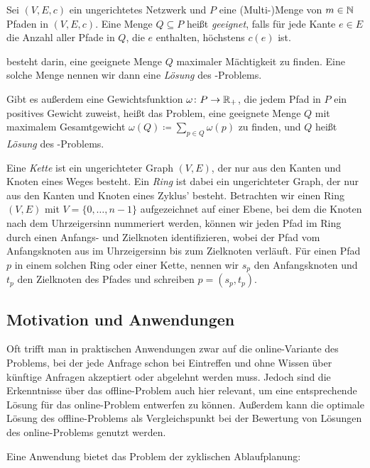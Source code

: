 \begin{definition}
    Sei $(V,E,c)$ ein ungerichtetes Netzwerk und $P$ eine (Multi-)Menge von $m \in \mathbb N$ Pfaden in $(V,E,c)$.
    Eine Menge $Q \subseteq P$ heißt {\em geeignet}, falls für jede Kante $e \in E$ die Anzahl aller Pfade in $Q$,
    die $e$ enthalten, höchstens $c(e)$ ist.
    
    {\em \CallControl} besteht darin, eine geeignete Menge $Q$ maximaler Mächtigkeit zu finden.
    Eine solche Menge nennen wir dann eine {\em Lösung} des \CallControl-Problems.
    
    Gibt es außerdem eine Gewichtsfunktion $\omega \colon P \rightarrow \mathbb R_+$, die jedem Pfad in $P$ ein 
    positives Gewicht zuweist, heißt das Problem, eine geeignete Menge $Q$ mit maximalem Gesamtgewicht
    $\omega(Q) \coloneqq \sum_{p \in Q} \omega(p)$ zu finden, {\em \WeightedCallControl} und $Q$ heißt 
    {\em Lösung} des \WeightedCallControl-Problems.
\end{definition}

Eine {\em Kette} ist ein ungerichteter Graph $(V,E)$, der nur aus den Kanten und Knoten eines Weges besteht.
Ein {\em Ring} ist dabei ein ungerichteter Graph, der nur aus den Kanten und Knoten eines Zyklus' besteht.
Betrachten wir einen Ring $(V,E)$ mit $V=\{0, \dots , n-1\}$ aufgezeichnet auf einer Ebene, bei dem die Knoten nach
dem Uhrzeigersinn nummeriert werden, können wir jeden Pfad im Ring durch einen Anfangs- und Zielknoten identifizieren,
wobei der Pfad vom Anfangsknoten aus im Uhrzeigersinn bis zum Zielknoten \glqq verläuft\grqq.
Für einen Pfad $p$ in einem solchen Ring oder einer Kette, nennen wir $s_p$ den
Anfangsknoten und $t_p$ den Zielknoten des Pfades und schreiben $p=(s_p, t_p)$.


\subsection{Motivation und Anwendungen}\label{subsec:motivationUndAnwendungen}

Oft trifft man in praktischen Anwendungen zwar auf die online-Variante des Problems, bei der jede Anfrage schon bei Eintreffen und
ohne Wissen über künftige Anfragen akzeptiert oder abgelehnt werden muss.
Jedoch sind die Erkenntnisse über das offline-Problem auch hier relevant, um eine entsprechende Lösung für das
online-Problem entwerfen zu können.
Außerdem kann die optimale Lösung des offline-Problems als Vergleichspunkt bei der Bewertung von Lösungen des
online-Problems genutzt werden.

Eine Anwendung bietet das Problem der zyklischen Ablaufplanung:

